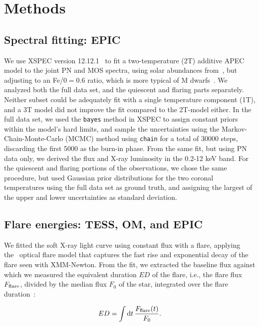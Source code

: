 \documentclass[twocolumn]{aastex631}
\begin{document}
\section{Methods}
\label{sec:methods}


\subsection{Spectral fitting: EPIC}
\label{sec:methods:epic}
We use XSPEC version 12.12.1~\citep{arnaud1996xspec} to fit a two-temperature (2T) additive APEC~\citep{smith2001collisional,foster2012updated} model to the joint PN and MOS spectra, using solar abundances from~\citet{grevesse1998standard}, but adjusting to an Fe/0$=0.6$ ratio, which is more typical of M dwarfs~\citep{wood2018chandra}. We analyzed both the full data set, and the quiescent and flaring parts separately. Neither subset could be adequately fit with a single temperature component (1T), and a 3T model did not improve the fit compared to the 2T-model either. In the full data set, we used the \texttt{bayes} method in XSPEC to assign constant priors within the model's hard limits, and sample the uncertainties using the Markov-Chain-Monte-Carlo (MCMC) method using \texttt{chain} for a total of 30000 steps, discarding the first 5000 as the burn-in phase. From the same fit, but using PN data only, we derived the flux and X-ray luminosity in the 0.2-12 keV band. For the quiescent and flaring portions of the observations, we chose the same procedure, but used Gaussian prior distributions for the two coronal temperatures using the full data set as ground truth, and assigning the largest of the upper and lower uncertainties as standard deviation.

\subsection{Flare energies: TESS, OM, and EPIC}

We fitted the soft X-ray light curve using constant flux with a flare, applying the~\citet{davenport2014kepler} optical flare model that captures the fast rise and exponential decay of the flare seen with XMM-Newton. From the fit, we extracted the baseline flux against which we measured the equivalent duration $ED$ of the flare, i.e., the flare flux $F_{\rm flare}$, divided by the median flux $F_0$ of the star, integrated over the flare duration~\citep{gershberg1972results}:

\begin{equation}
\label{eq:ED}
ED=\displaystyle \int \mathrm dt\, \frac{F_{\rm flare}(t)}{F_0}.
\end{equation}
\end{document}
